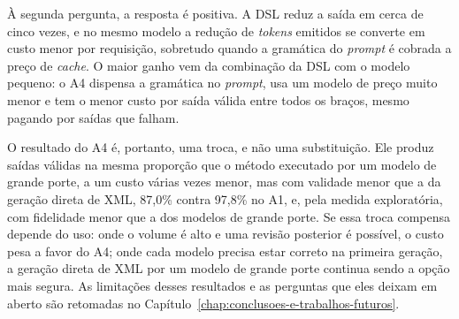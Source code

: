 À segunda pergunta, a resposta é positiva. A DSL reduz a saída em cerca de cinco vezes, e no mesmo modelo a redução de \textit{tokens} emitidos se converte em custo menor por requisição, sobretudo quando a gramática do \textit{prompt} é cobrada a preço de \textit{cache}. O maior ganho vem da combinação da DSL com o modelo pequeno: o A4 dispensa a gramática no \textit{prompt}, usa um modelo de preço muito menor e tem o menor custo por saída válida entre todos os braços, mesmo pagando por saídas que falham.

O resultado do A4 é, portanto, uma troca, e não uma substituição. Ele produz saídas válidas na mesma proporção que o método executado por um modelo de grande porte, a um custo várias vezes menor, mas com validade menor que a da geração direta de XML, 87,0\% contra 97,8\% no A1, e, pela medida exploratória, com fidelidade menor que a dos modelos de grande porte. Se essa troca compensa depende do uso: onde o volume é alto e uma revisão posterior é possível, o custo pesa a favor do A4; onde cada modelo precisa estar correto na primeira geração, a geração direta de XML por um modelo de grande porte continua sendo a opção mais segura. As limitações desses resultados e as perguntas que eles deixam em aberto são retomadas no Capítulo~\ref{chap:conclusoes-e-trabalhos-futuros}.
